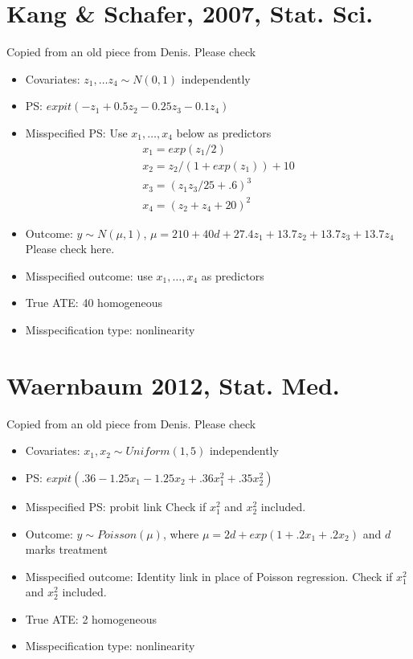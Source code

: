 \documentclass{article}
\begin{document}
\section{Kang \& Schafer, 2007, Stat. Sci.}
{\color{red}Copied from an old piece from Denis. Please check}
\begin{itemize}
\item Covariates:  $z_1, \ldots z_4 \sim N(0,1)$ independently
\item PS: $expit(-z_1 + 0.5z_2 -0.25z_3 - 0.1z_4)$
\item 
Misspecified PS: Use $x_1, \ldots, x_4$ below as predictors 
\begin{displaymath} \begin{split} x_1 = exp(z_1/2)  \\
x_2 = z_2 /(1+exp(z_1)) + 10\\
x_3 = (z_1z_3/25 + .6)^3 \\
x_4 = (z_2 +z_4 +20)^2 
\end{split}\end{displaymath}
\item Outcome:  $y \sim N(\mu, 1)$, $\mu = 210 + 40d  + 27.4 z_1 + 13.7z_2 + 13.7z_3+ 13.7z_4$\\
{\color{red} Please check here.} 
\item Misspecified outcome: use $x_1, \ldots, x_4$ as predictors
\item True ATE: {\color{red} 40 homogeneous }
\item Misspecification type: nonlinearity
\end{itemize}


\section{Waernbaum 2012, Stat. Med.}
{\color{red}Copied from an old piece from Denis. Please check}
\begin{itemize}
\item Covariates: $x_1, x_2 \sim Uniform(1, 5)$ independently
\item PS: $expit(.36-1.25x_1-1.25x_2 + .36 x_1^2 + .35x_2^2)$
\item Misspecified PS: probit link  {\color{red} Check if $x_1^2$ and $x_2^2$ included.}
\item Outcome: $y \sim Poisson(\mu)$, where $\mu = 2d + exp(1+.2x_1 + .2x_2)$ and $d$ marks treatment
\item Misspecified outcome: Identity link in place of Poisson regression. {\color{red} Check if $x_1^2$ and $x_2^2$ included.}
\item True ATE: 2 homogeneous 
\item Misspecification type: nonlinearity
\end{itemize}
\end{document}
